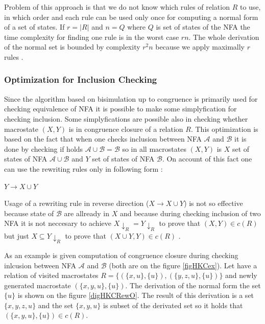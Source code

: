 Problem of this approach is that we do not know which rules of relation $R$ to use, in which order and each rule can be used only once for computing a normal
form of a set of states. If $r=|R|$ and $n=Q$ where $Q$ is set of states of the NFA the time complexity for finding one rule is in the worst case $rn$.
The whole derivation of the normal set is bounded by complexity $r^2 n$ because we apply maximally $r$ rules \cite{popl13}.

\subsubsection{Optimization for Inclusion Checking}
\label{congrOpt}
Since the algorithm based on bisimulation up to congruence is primarily used for checking equivalence of NFA it is possible to make some simplyfication for
checking inclusion. Some simplyfications are possible also in checking whether macrostate $(X,Y)$ is in congruence closure of a relation $R$. This optimization
is based on the fact that when one checks inclusion between NFA $\mathcal{A}$ and $\mathcal{B}$ it is done by checking if holds $\mathcal{A}\cup\mathcal{B}=
\mathcal{B}$ so in all macrostates $(X,Y)$ is $X$ set of states of NFA $\mathcal{A}\cup\mathcal{B}$ and $Y$ set of states of NFA $\mathcal{B}$. On account
of this fact one can use the rewriting rules only in following form \cite{popl13}:
\begin{center}
$Y\rightarrow X\cup Y$
\end{center}
Usage of a rewriting rule in reverse direction ($X\rightarrow X\cup Y$) is not so effective because state of $\mathcal{B}$ are allready in $X$ and because
during checking inclusion of two NFA it is not neccesary to achieve $X{\downarrow_R}=Y{\downarrow_R}$ to prove that $(X,Y)\in c(R)$ 
but just $X \subseteq Y{\downarrow_R}$ to prove that $(X\cup Y,Y)\in c(R)$ \cite{popl13}.

As an example is given computation of congruence closure during checking inlcusion between NFA $\mathcal{A}$ and $\mathcal{B}$ (both are on the figure 
\ref{figHKCex}). Let have a relation of visited macrostates $R=\{(\{x,u\},\{u\}),(\{y,z,u\},\{u\})\}$ and newly generated macrostate $(\{x,y,u\},\{u\})$. The
derivation of the normal form the set $\{u\}$ is shown on the figure \ref{digHKCRewO}. The result of this derivation is a set $\{x,y,z,u\}$ and
the set $\{x,y,u\}$ is subset of the derivated set so it holds that $(\{x,y,u\},\{u\})\in c(R)$.


